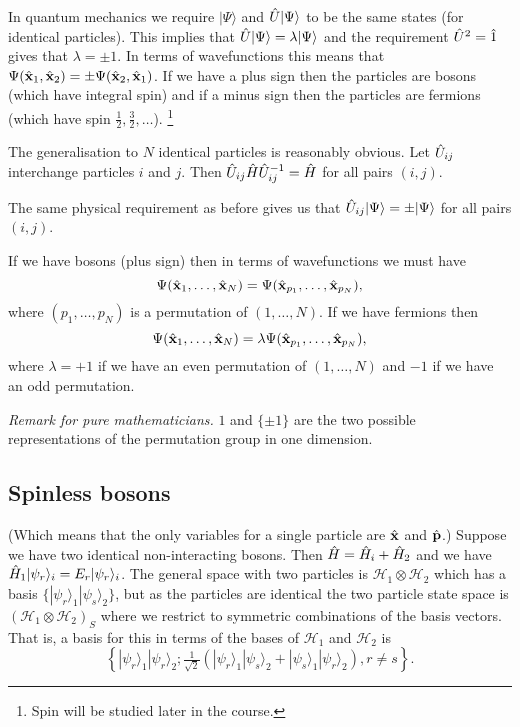 \documentclass{notes}
\newcommand{\cH}{\mathcal{H}}
\newcommand{\ket}[1]{|#1\rangle}
\begin{document}
In quantum mechanics we require $\ket{\Psi}$ and $\Hat{U} \ket{\Psi}$ to
be the same states (for identical particles).  This implies
that $\Hat{U} \ket{\Psi} = \lambda \ket{\Psi}$ and the requirement
$\Hat{U}^2 = \Hat{1}$ gives that $\lambda = \pm 1$.  In terms of
wavefunctions this means that
$\Psi(\Hat{\mathbf{x}}_1, \Hat{\mathbf{x}}_2) = \pm \Psi(\Hat{\mathbf{x}}_2,
\Hat{\mathbf{x}}_1)$.  If we have a plus sign then the particles are
bosons (which have integral spin) and if a minus sign then the particles
are fermions (which have spin $\tfrac{1}{2}, \tfrac{3}{2}, \dots$).%
\footnote{Spin will be studied later in the course.}

The generalisation to $N$ identical particles is reasonably obvious.
Let $\Hat{U}_{ij}$ interchange particles $i$ and $j$.  Then
$\Hat{U}_{ij} \Hat{H} \Hat{U}_{ij}^{-1} = \Hat{H}$ for all pairs
$(i,j)$.

The same physical requirement as before gives us that
$\Hat{U}_{ij} \ket{\Psi} = \pm \ket{\Psi}$ for all pairs $(i,j)$.

If we have bosons (plus sign) then in terms of wavefunctions we must have
\[
\Psi(\Hat{\mathbf{x}}_1, \dots, \Hat{\mathbf{x}}_N) = \Psi(
\Hat{\mathbf{x}}_{p_1}, \dots, \Hat{\mathbf{x}}_{p_N}),
\]
where
$(p_1, \dots, p_N)$ is a permutation of $(1, \dots, N)$.  If we have
fermions then 
\[
\Psi(\Hat{\mathbf{x}}_1, \dots, \Hat{\mathbf{x}}_N) = \lambda \Psi(
\Hat{\mathbf{x}}_{p_1}, \dots, \Hat{\mathbf{x}}_{p_N}),
\]
where
$\lambda = +1$ if we have an even permutation of $(1, \dots, N)$ and
$-1$ if we have an odd permutation.

\emph{Remark for pure mathematicians.}  $1$ and $\{ \pm 1 \}$ are the
two possible representations of the permutation group in one dimension.

\subsection{Spinless bosons}

(Which means that the only variables for a single particle are
$\Hat{\mathbf{x}}$ and $\Hat{\mathbf{p}}$.)  Suppose we have two identical
non-interacting bosons.  Then $\Hat{H} = \Hat{H}_i + \Hat{H}_2$ and
we have $\Hat{H}_1 \ket{\psi_r}_i = E_r \ket{\psi_r}_i$.  The general space
with two particles is $\cH_1 \otimes \cH_2$ which has a basis
$\{ \ket{\psi_r}_1 \ket{\psi_s}_2 \}$,  but as the particles are identical
the two particle state space is $(\cH_1 \otimes \cH_2)_S$ where we restrict
to symmetric combinations of the basis vectors.  That is, a basis
for this in terms of the bases of $\cH_1$ and $\cH_2$ is
\[
\left\{ \ket{\psi_r}_1 \ket{\psi_r}_2; \tfrac{1}{\sqrt{2}}
\left( \ket{\psi_r}_1 \ket{\psi_s}_2 + \ket{\psi_s}_1 \ket{\psi_r}_2 \right),
r \neq s \right\}.
\]
\end{document}
